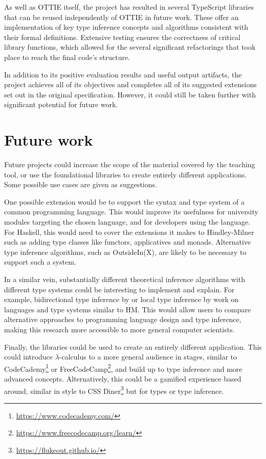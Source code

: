 \documentclass[a4paper,fleqn,oneside,12pt]{report}
\begin{document}
As well as OTTIE itself, the project has resulted in several TypeScript libraries that can be reused independently of OTTIE in future work. These offer an implementation of key type inference concepts and algorithms consistent with their formal definitions. Extensive testing ensures the correctness of critical library functions, which allowed for the several significant refactorings that took place to reach the final code's structure.

In addition to its positive evaluation results and useful output artifacts, the project achieves all of its objectives and completes all of its suggested extensions set out in the original specification. However, it could still be taken further with significant potential for future work.

\section{Future work}

Future projects could increase the scope of the material covered by the teaching tool, or use the foundational libraries to create entirely different applications. Some possible use cases are given as suggestions.

One possible extension would be to support the syntax and type system of a common programming language. This would improve its usefulness for university modules targeting the chosen language, and for developers using the language. For Haskell, this would need to cover the extensions it makes to Hindley-Milner such as adding type classes like functors, applicatives and monads. Alternative type inference algorithms, such as OutsideIn(X), are likely to be necessary to support such a system.

In a similar vein, substantially different theoretical inference algorithms with different type systems could be interesting to implement and explain. For example, bidirectional type inference by \cite{ref38} or local type inference by \cite{ref39} work on languages and type systems similar to HM. This would allow users to compare alternative approaches to programming language design and type inference, making this research more accessible to more general computer scientists.

Finally, the libraries could be used to create an entirely different application. This could introduce $\lambda$-calculus to a more general audience in stages, similar to CodeCademy\footnote{\href{https://www.codecademy.com/}{https://www.codecademy.com/}} or FreeCodeCamp\footnote{\href{https://www.freecodecamp.org/learn/}{https://www.freecodecamp.org/learn/}}, and build up to type inference and more advanced concepts. Alternatively, this could be a gamified experience based around, similar in style to CSS Diner\footnote{\href{https://flukeout.github.io/}{https://flukeout.github.io/}} but for types or type inference.
\end{document}
